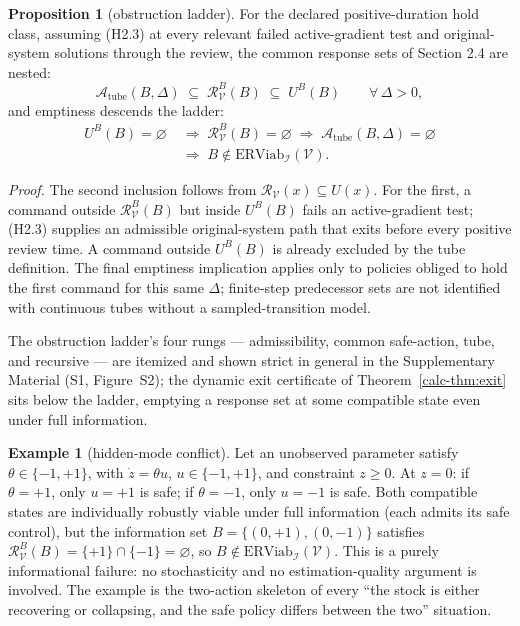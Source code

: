 \documentclass[10pt,twocolumn]{article}
\theoremstyle{definition}
\newtheorem{proposition}{Proposition}
\newtheorem{example}{Example}
\begin{document}
\begin{proposition}[obstruction ladder]\label{calc-prop:ladder}
For the declared positive-duration hold class, assuming (H2.3) at every relevant failed active-gradient test and original-system solutions through the review, the common response sets
of Section 2.4 are nested:
\[\mathcal{A}_{\mathrm{tube}}(B,\Delta) \;\subseteq\; \mathcal{R}_{\mathcal{V}}^B(B) \;\subseteq\; U^B(B) \qquad \forall\,\Delta>0,\]
and emptiness descends the ladder:
\[
\begin{aligned}
U^B(B)=\varnothing \;&\Longrightarrow\; \mathcal{R}_{\mathcal{V}}^B(B)=\varnothing \;\Longrightarrow\; \mathcal{A}_{\mathrm{tube}}(B,\Delta)=\varnothing \\
&\Longrightarrow\; B\notin\mathrm{ERViab}_{\mathcal{I}}(\mathcal{V}).
\end{aligned}
\]
\end{proposition}

\emph{Proof.} The second inclusion follows from \(\mathcal R_{\mathcal V}(x)\subseteq U(x)\). For the first, a command outside \(\mathcal R_{\mathcal V}^B(B)\) but inside \(U^B(B)\) fails an active-gradient test; (H2.3) supplies an admissible original-system path that exits before every positive review time. A command outside \(U^B(B)\) is already excluded by the tube definition. The final emptiness implication applies only to policies obliged to hold the first command for this same \(\Delta\); finite-step predecessor sets are not identified with continuous tubes without a sampled-transition model.

The obstruction ladder's four rungs --- admissibility, common safe-action, tube, and recursive --- are itemized and shown strict in general in the Supplementary Material (S1, Figure~S2); the dynamic exit certificate of Theorem~\ref{calc-thm:exit} sits below the ladder, emptying a response set at some compatible state even under full information.

\begin{example}[hidden-mode conflict]\label{calc-ex:hidden-mode} Let an unobserved parameter satisfy
\(\theta \in \{-1, +1\}\), with \(\dot z = \theta u\),
\(u \in \{-1, +1\}\), and constraint \(z \ge 0\). At \(z = 0\): if
\(\theta = +1\), only \(u = +1\) is safe; if \(\theta = -1\), only
\(u = -1\) is safe. Both compatible states are individually robustly
viable under full information (each admits its safe control), but the
information set \(B = \{(0, +1), (0, -1)\}\) satisfies
\(\mathcal{R}_{\mathcal{V}}^B(B) = \{+1\} \cap \{-1\} = \varnothing\),
so \(B \notin \mathrm{ERViab}_{\mathcal{I}}(\mathcal{V})\). This is a
purely informational failure: no stochasticity and no estimation-quality
argument is involved. The example is the two-action skeleton of every
``the stock is either recovering or collapsing, and the safe policy
differs between the two'' situation.

\end{example}
\end{document}
